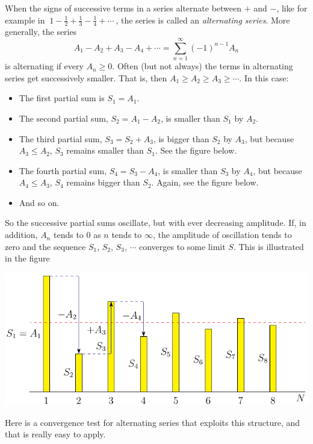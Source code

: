 When the signs of successive terms in a series alternate between
$+$ and $-$, like for example in
$
\ 1-\frac{1}{2} +\frac{1}{3}-\frac{1}{4}+ \cdots\
$,
the series is called an \emph{alternating series}. More generally,
the series
\begin{equation*}
A_1-A_2+A_3-A_4+\cdots =\sum_{n=1}^\infty (-1)^{n-1} A_n
\end{equation*}
is alternating if every $A_n\ge 0$.
Often (but not always) the terms in alternating series get successively
smaller. That is, then $A_1\ge A_2 \ge A_3 \ge \cdots$. In this case:
\begin{itemize}
\item The first partial sum is $S_1=A_1$.
\item The second partial sum, $S_2=A_1-A_2$, is smaller than $S_1$
by $A_2$.
\item The third partial sum, $S_3=S_2+A_3$, is bigger than $S_2$
by $A_3$, but because $A_3\le A_2$, $S_3$ remains smaller than $S_1$.
See the figure below.
\item The fourth partial sum, $S_4=S_3-A_4$, is smaller than $S_3$
by $A_4$, but because $A_4\le A_3$, $S_4$ remains bigger than $S_2$.
Again, see the figure below.
\item And so on.
\end{itemize}
So the successive partial sums oscillate, but with ever decreasing
amplitude. If, in addition, $A_n$ tends to $0$ as $n$ tends to
$\infty$, the amplitude of oscillation tends to zero and the
sequence $S_1$, $S_2$, $S_3$, $\cdots$ converges to some limit $S$.
This is illustrated in the figure
\begin{efig}
\begin{center}
     \includegraphics{altSeriesF.pdf}
\end{center}
\end{efig}
Here is a convergence test for alternating series that exploits
this structure, and that is really easy to apply.



